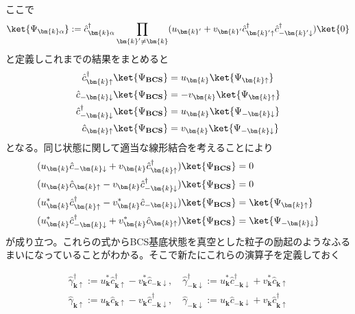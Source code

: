 \documentclass[dvipdfmx, 11pt, a4paper]{jsarticle}
\numberwithin{equation}{section}
\theoremstyle{definition}
\begin{document}
    ここで
    \begin{equation}
        \ket{\Psi_{\bm{k}\alpha}} := \hat{c}_{\bm{k}\alpha}^\dagger \prod_{\bm{k}'\ne\bm{k}}(u_{\bm{k}'}+v_{\bm{k}'}\hat{c}_{\bm{k}'\uparrow}^\dagger \hat{c}_{-\bm{k}'\downarrow}^\dagger) \ket{0}
    \end{equation}
    と定義しこれまでの結果をまとめると
    \begin{align}
        \hat{c}_{\bm{k}\uparrow}^\dagger \ket{\Psi_{\textbf{BCS}}} &= u_{\bm{k}} \ket{\Psi_{\bm{k}\uparrow}}\\
        \hat{c}_{-\bm{k}\downarrow} \ket{\Psi_{\textbf{BCS}}} &= -v_{\bm{k}} \ket{\Psi_{\bm{k}\uparrow}}\\
        \hat{c}_{-\bm{k}\downarrow}^\dagger \ket{\Psi_{\textbf{BCS}}} &= u_{\bm{k}} \ket{\Psi_{-\bm{k}\downarrow}}\\
        \hat{c}_{\bm{k}\uparrow} \ket{\Psi_{\textbf{BCS}}} &= v_{\bm{k}} \ket{\Psi_{-\bm{k}\downarrow}}
    \end{align}
    となる。同じ状態に関して適当な線形結合を考えることにより
    \begin{align}
        &(u_{\bm{k}}\hat{c}_{-\bm{k}\downarrow} + v_{\bm{k}}\hat{c}_{\bm{k}\uparrow}^\dagger )\ket{\Psi_{\textbf{BCS}}} = 0 \\
        &( u_{\bm{k}}\hat{c}_{\bm{k}\uparrow}-v_{\bm{k}}\hat{c}_{-\bm{k}\downarrow}^\dagger )\ket{\Psi_{\textbf{BCS}}} = 0 \\
        &(u_{\bm{k}}^*\hat{c}_{\bm{k}\uparrow}^\dagger-v_{\bm{k}}^*\hat{c}_{-\bm{k}\downarrow} )\ket{\Psi_{\textbf{BCS}}} = \ket{\Psi_{\bm{k}\uparrow}} \\
        &( u_{\bm{k}}^*\hat{c}_{-\bm{k}\downarrow}^\dagger +  v_{\bm{k}}^*\hat{c}_{\bm{k}\uparrow} )\ket{\Psi_{\textbf{BCS}}} = \ket{\Psi_{-\bm{k}\downarrow}} 
    \end{align}
    が成り立つ。これらの式からBCS基底状態を真空とした粒子の励起のようなふるまいになっていることがわかる。そこで新たにこれらの演算子を定義しておく
    \begin{definition}
        \begin{equation}
            \begin{aligned}
                \hat{\gamma}_{\bm{k}\uparrow}^\dagger :=  u_{\bm{k}}^*\hat{c}_{\bm{k}\uparrow}^\dagger-v_{\bm{k}}^*\hat{c}_{-\bm{k}\downarrow},\quad \hat{\gamma}_{-\bm{k}\downarrow}^\dagger := u_{\bm{k}}^*\hat{c}_{-\bm{k}\downarrow}^\dagger +  v_{\bm{k}}^*\hat{c}_{\bm{k}\uparrow}\\
                \hat{\gamma}_{\bm{k}\uparrow} := u_{\bm{k}}\hat{c}_{\bm{k}\uparrow} - v_{\bm{k}}\hat{c}_{-\bm{k}\downarrow}^\dagger ,\quad \hat{\gamma}_{-\bm{k}\downarrow} := u_{\bm{k}}\hat{c}_{-\bm{k}\downarrow} +  v_{\bm{k}}\hat{c}_{\bm{k}\uparrow}^\dagger
            \end{aligned}
        \end{equation}
    \end{definition}
\end{document}
